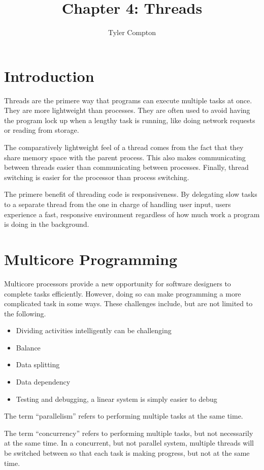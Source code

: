 \documentclass{article}
\author{Tyler Compton}
\title{Chapter 4: Threads}
\begin{document}
\maketitle
\tableofcontents

\section{Introduction}
Threads are the primere way that programs can execute multiple tasks at once.
They are more lightweight than processes. They are often used to avoid having
the program lock up when a lengthy task is running, like doing network requests
or reading from storage.

The comparatively lightweight feel of a thread comes from the fact that they
share memory space with the parent process. This also makes communicating
between threads easier than communicating between processes. Finally, thread
switching is easier for the processor than process switching.

The primere benefit of threading code is responsiveness. By delegating slow
tasks to a separate thread from the one in charge of handling user input, users
experience a fast, responsive environment regardless of how much work a
program is doing in the background.

\section{Multicore Programming}
Multicore processors provide a new opportunity for software designers to
complete tasks efficiently. However, doing so can make programming a more
complicated task in some ways. These challenges include, but are not limited to
the following.

\begin{itemize}
	\item Dividing activities intelligently can be challenging
	\item Balance
	\item Data splitting
	\item Data dependency
	\item Testing and debugging, a linear system is simply easier to debug
\end{itemize}

The term ``parallelism'' refers to performing multiple tasks at the same time.

The term ``concurrency'' refers to performing multiple tasks, but not
necessarily at the same time. In a concurrent, but not parallel system,
multiple threads will be switched between so that each task is making progress,
but not at the same time.
\end{document}
